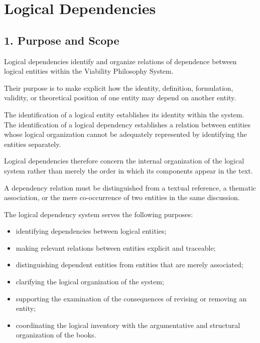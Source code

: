 
\cleardoublepage

\section*{Logical Dependencies}

{}


\subsection*{1. Purpose and Scope}

Logical dependencies identify and organize relations
of dependence between logical entities within the
Viability Philosophy System.

Their purpose is to make explicit how the identity,
definition, formulation, validity, or theoretical
position of one entity may depend on another entity.

The identification of a logical entity establishes
its identity within the system. The identification
of a logical dependency establishes a relation
between entities whose logical organization cannot
be adequately represented by identifying the
entities separately.

Logical dependencies therefore concern the internal
organization of the logical system rather than merely
the order in which its components appear in the text.

A dependency relation must be distinguished from
a textual reference, a thematic association, or
the mere co-occurrence of two entities in the same
discussion.

The logical dependency system serves the following
purposes:

\begin{itemize}
    \item identifying dependencies between logical
    entities;
    \item making relevant relations between entities
    explicit and traceable;
    \item distinguishing dependent entities from
    entities that are merely associated;
    \item clarifying the logical organization of
    the system;
    \item supporting the examination of the
    consequences of revising or removing an entity;
    \item coordinating the logical inventory with
    the argumentative and structural organization
    of the books.
\end{itemize}

